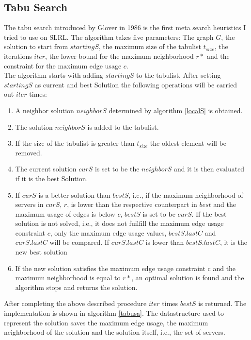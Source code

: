 \documentclass [12pt]{article}
\begin{document}
\subsection{Tabu Search}
The tabu search introduced by Glover in 1986 \cite{Glover:1986:FPI:15310.15311} is the first meta search heuristics I tried to use on SLRL.
The algorithm takes five parameters: The graph $G$, the solution
to start from $startingS$, the maximum size of the tabulist $t_{size}$, the iterations $iter$, the lower bound for the maximum neighborhood
$r*$ and the constraint for the maximum edge usage $c$.\\
The algorithm starts with adding $startingS$ to the tabulist.  
After setting $startingS$ as current and best Solution the following operations will be carried out $iter$ times: 
\begin{enumerate}
  \item{A neighbor solution $neighborS$ determined by algorithm \ref{localS} is obtained.}
  \item{The solution $neighborS$ is added to the tabulist.}
  \item{If the size of the tabulist is greater than $t_{size}$ the oldest element will be removed.}
  \item{The current solution $curS$ is set to be the $neighborS$ and it is then evaluated if it is the best Solution.}
  \item{If $curS$ is a better solution than $bestS$, i.e., if the maximum neighborhood of servers in $curS$, $r$, is lower than the respective counterpart in 
      $best$ and the maximum usage of edges is below $c$, $bestS$ is set to be $curS$. If the best solution is not solved, i.e., it does not fuilfill the
      maximum edge usage constraint $c$, only the maximum edge usage values,
    $bestS.lastC$ and $curS.lastC$ will be compared. If $curS.lastC$ is lower than $bestS.lastC$, it is the new best solution}
  \item{If the new solution satisfies the maximum edge usage constraint c and the maximum neighborhood is equal to $r*$, an optimal
    solution is found and the algorithm stops and returns the solution.}
\end{enumerate}
After completing the above described procedure $iter$ times $bestS$ is returned.
The implementation is shown in algorithm \ref{tabusa}. The datastructure used to represent the solution saves the maximum edge usage, the maximum neighborhood
of the solution and the solution itself, i.e., the set of servers. 
\end{document}
